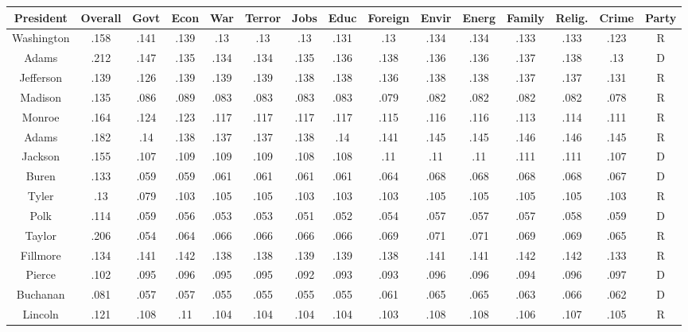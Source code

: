 \begin{sidewaystable}
\begin{singlespace}
\begin{center}
 \begin{tabular}{||c c c c c c c c c c c c c c c||}
 \hline
 President & Overall & Govt & Econ & War & Terror & Jobs & Educ & Foreign & Envir & Energ & Family & Relig. & Crime & Party\\
 \hline\hline
 Washington & .158 & .141 & .139 & .13 & .13 & .13 & .131 & .13 & .134 & .134 & .133 & .133 & .123 & R \\ 
\hline
Adams & .212 & .147 & .135 & .134 & .134 & .135 & .136 & .138 & .136 & .136 & .137 & .138 & .13 & D \\ 
\hline
Jefferson & .139 & .126 & .139 & .139 & .139 & .138 & .138 & .136 & .138 & .138 & .137 & .137 & .131 & R \\ 
\hline
Madison & .135 & .086 & .089 & .083 & .083 & .083 & .083 & .079 & .082 & .082 & .082 & .082 & .078 & R \\ 
\hline
Monroe & .164 & .124 & .123 & .117 & .117 & .117 & .117 & .115 & .116 & .116 & .113 & .114 & .111 & R \\ 
\hline
Adams & .182 & .14 & .138 & .137 & .137 & .138 & .14 & .141 & .145 & .145 & .146 & .146 & .145 & R \\ 
\hline
Jackson & .155 & .107 & .109 & .109 & .109 & .108 & .108 & .11 & .11 & .11 & .111 & .111 & .107 & D \\ 
\hline
Buren & .133 & .059 & .059 & .061 & .061 & .061 & .061 & .064 & .068 & .068 & .068 & .068 & .067 & D \\ 
\hline
Tyler & .13 & .079 & .103 & .105 & .105 & .103 & .103 & .103 & .105 & .105 & .105 & .105 & .103 & R \\ 
\hline
Polk & .114 & .059 & .056 & .053 & .053 & .051 & .052 & .054 & .057 & .057 & .057 & .058 & .059 & D \\ 
\hline
Taylor & .206 & .054 & .064 & .066 & .066 & .066 & .066 & .069 & .071 & .071 & .069 & .069 & .065 & R \\ 
\hline
Fillmore & .134 & .141 & .142 & .138 & .138 & .139 & .139 & .138 & .141 & .141 & .142 & .142 & .133 & R \\ 
\hline
Pierce & .102 & .095 & .096 & .095 & .095 & .092 & .093 & .093 & .096 & .096 & .094 & .096 & .097 & D \\ 
\hline
Buchanan & .081 & .057 & .057 & .055 & .055 & .055 & .055 & .061 & .065 & .065 & .063 & .066 & .062 & D \\ 
\hline
Lincoln & .121 & .108 & .11 & .104 & .104 & .104 & .104 & .103 & .108 & .108 & .106 & .107 & .105 & R \\ 

\end{tabular}
\end{center}
\end{singlespace}
\end{sidewaystable}
